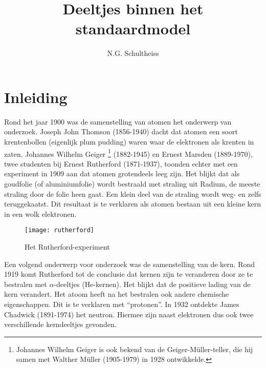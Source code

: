 



\title{Deeltjes binnen het standaardmodel}
\author{N.G. Schultheiss}
\date{}

\maketitle
\thispagestyle{firststyle}

\section{Inleiding}

Rond het jaar 1900 was de samenstelling van atomen het onderwerp van
onderzoek. Joseph John Thomson (1856-1940) dacht dat atomen een soort
krentenbollen (eigenlijk plum pudding) waren waar de elektronen als
krenten in zaten. Johannes Wilhelm Geiger \footnote{Johannes Wilhelm
Geiger is ook bekend van de Geiger-Müller-teller, die hij samen met
Walther Müller (1905-1979) in 1928 ontwikkelde.} (1882-1945) en Ernest
Marsden (1889-1970), twee studenten bij Ernest Rutherford (1871-1937),
toonden echter met een experiment in 1909 aan dat atomen grotendeels
leeg zijn. Het blijkt dat als goudfolie (of aluminiumfolie) wordt
bestraald met straling uit Radium, de meeste straling door de folie heen
gaat. Een klein deel van de straling wordt weg- en zelfs teruggekaatst.
Dit resultaat is te verklaren als atomen bestaan uit een kleine kern in
een wolk elektronen.

\begin{figure}[H]
\noindent \begin{centering}
\texttt{[image: rutherford]}
\par\end{centering}

\caption{Het Rutherford-experiment}


\end{figure}


Een volgend onderwerp voor onderzoek was de samenstelling van de kern.
Rond 1919 komt Rutherford tot de conclusie dat kernen zijn te veranderen
door ze te bestralen met $\alpha$-deeltjes (He-kernen). Het blijkt
dat de positieve lading van de kern verandert. Het atoom heeft na
het bestralen ook andere chemische eigenschappen. Dit is te verklaren
met ``protonen''. In 1932 ontdekte James Chadwick (1891-1974) het
neutron. Hiermee zijn naast elektronen dus ook twee verschillende
kerndeeltjes gevonden. 


